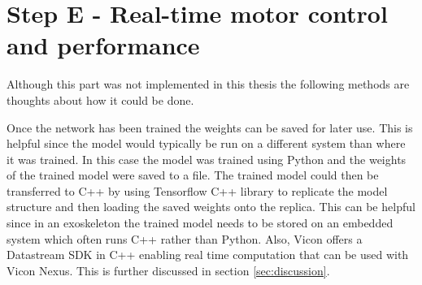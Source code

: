 \documentclass[../main.tex]{subfiles}
\begin{document}
\section{Step E - Real-time motor control and performance}
Although this part was not implemented in this thesis the following methods are thoughts about how it could be done.

Once the network has been trained the weights can be saved for later use.
This is helpful since the model would typically be run on a different system than where it was trained.
In this case the model was trained using Python and the weights of the trained model were saved to a file.
The trained model could then be transferred to C++ by using Tensorflow C++ library to replicate the model structure and then loading the saved weights onto the replica.
This can be helpful since in an exoskeleton the trained model needs to be stored on an embedded system which often runs C++ rather than Python.
Also, Vicon offers a Datastream SDK in C++ enabling real time computation that can be used with Vicon Nexus.
This is further discussed in section \ref{sec:discussion}.
\end{document}
